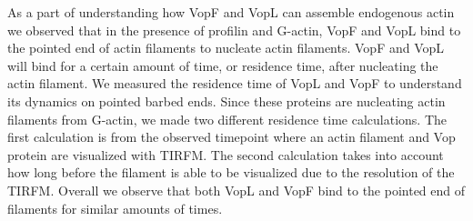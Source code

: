 As a part of understanding how VopF and VopL can assemble endogenous actin we observed that in the presence of profilin and G-actin, VopF and VopL bind to the pointed end of actin filaments to nucleate actin filaments. VopF and VopL will bind for a certain amount of time, or residence time, after nucleating the actin filament. We measured the residence time of VopL and VopF to understand its dynamics on pointed barbed ends. Since these proteins are nucleating actin filaments from G-actin, we made two different residence time calculations. The first calculation is from the observed timepoint where an actin filament and Vop protein are visualized with TIRFM. The second calculation takes into account how long before the filament is able to be visualized due to the resolution of the TIRFM. Overall we observe that both VopL and VopF bind to the pointed end of filaments for similar amounts of times. 

